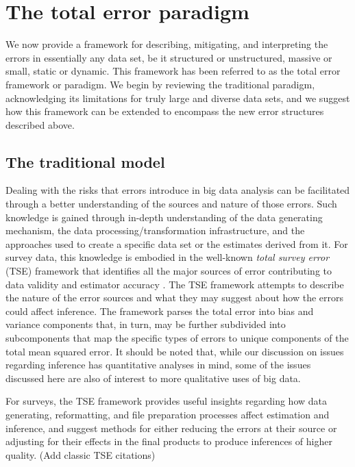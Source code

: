 \documentclass[]{krantz}
\begin{document}
\section{The total error paradigm}\label{sec:10-2}

We now provide a framework for describing, mitigating, and interpreting
the errors in essentially any data set, be it structured or
unstructured, massive or small, static or dynamic. This framework has
been referred to as the total error framework or paradigm. We begin by
reviewing the traditional paradigm, acknowledging its limitations for
truly large and diverse data sets, and we suggest how this framework can
be extended to encompass the new error structures described above.

\subsection{The traditional model}\label{sec:10-2.1}

Dealing with the risks that errors introduce in big data analysis can be
facilitated through a better understanding of the sources and nature of
those errors. Such knowledge is gained through in-depth understanding of
the data generating mechanism, the data processing/transformation
infrastructure, and the approaches used to create a specific data set or
the estimates derived from it. For survey data, this knowledge is
embodied in the well-known \emph{total survey error} (TSE) framework
that identifies all the major sources of error contributing to data
validity and estimator accuracy
\citep{groves2004survey, biemer2003, biemer2010total}. The TSE framework
attempts to describe the nature of the error sources and what they may
suggest about how the errors could affect inference. The framework
parses the total error into bias and variance components that, in turn,
may be further subdivided into subcomponents that map the specific types
of errors to unique components of the total mean squared error. It
should be noted that, while our discussion on issues regarding inference
has quantitative analyses in mind, some of the issues discussed here are
also of interest to more qualitative uses of big data.

For surveys, the TSE framework provides useful insights regarding how
data generating, reformatting, and file preparation processes affect
estimation and inference, and suggest methods for either reducing the
errors at their source or adjusting for their effects in the final
products to produce inferences of higher quality. (Add classic TSE
citations)
\end{document}
